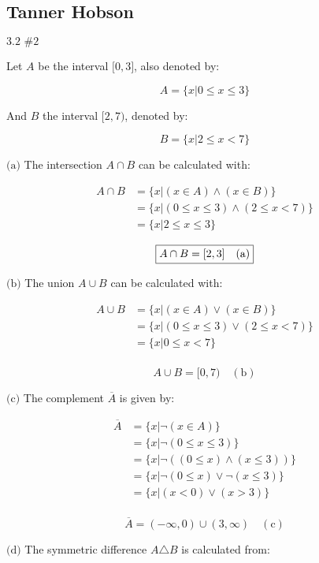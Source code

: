 \documentclass{article}
\newcommand{\problem}[2]{$\boxed{\text{#1 \##2}}$}
\newcommand{\subproblem}[1]{$\boxed{\text{(#1)}}$}
\newcommand{\subsolution}[2]{\boxed{#2\quad(\text{#1})}}
\newcommand{\multistep}[1]{\begin{array}{rl} #1 \end{array}}
\begin{document}
\begin{multicols*}{2}

\section*{Tanner Hobson}

%
\problem{3.2}{2}

Let $A$ be the interval $\lbrack0,3\rbrack$, also denoted by:

\[
A=\{x|0\le x\le 3\}
\]

And $B$ the interval $\lbrack2,7)$, denoted by:

\[
B=\{x|2\le x<7\}
\]

%
\subproblem{a} The intersection $A\cap{}B$ can be calculated with:

\[
\begin{array}{rl}
A\cap B&=\{x|(x\in A)\wedge(x\in B)\} \\
&=\{x|(0\le x\le 3)\wedge(2\le x<7)\} \\
&=\{x|2\le x\le 3\}
\end{array}
\]

\[
\subsolution{a}{A\cap B=\lbrack 2,3\rbrack} \\
\]

%
\subproblem{b} The union $A\cup{}B$ can be calculated with:

\[
\begin{array}{rl}
A\cup B&=\{x|(x\in A)\vee(x\in B)\} \\
&=\{x|(0\le x\le 3)\vee(2\le x<7)\} \\
&=\{x|0\le x<7\} \\
\end{array}
\]

\[
\subsolution{b}{A\cup B=\lbrack 0,7)}
\]

%
\subproblem{c} The complement $\overline{A}$ is given by:

\[
\multistep{
\overline{A}&=\{x|\neg(x\in A)\} \\
&=\{x|\neg(0\le x\le 3)\} \\
&=\{x|\neg((0\le x)\wedge(x\le 3))\} \\
&=\{x|\neg(0\le x)\vee\neg(x\le 3)\} \\
&=\{x|(x<0)\vee(x>3)\} \\
}
\]

\[
\subsolution{c}{\overline{A}=(-\infty,0)\cup(3,\infty)}
\]

%
\subproblem{d} The symmetric difference $A\triangle{}B$ is calculated
from:


\end{multicols*}
\end{document}
